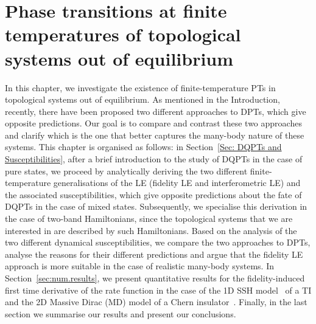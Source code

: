 %
%
%
%
%
%
%
\chapter{Phase transitions at finite temperatures of topological systems out of equilibrium}

 



In this chapter, we investigate the existence of finite-temperature PTs in topological systems out of equilibrium. As mentioned in the Introduction, recently, there have been proposed two different approaches to DPTs, which give opposite predictions. Our goal is to compare and contrast these two approaches and clarify which is the one that better captures the many-body nature of these systems.
This chapter is organised as follows: in Section~\ref{Sec: DQPTs and Susceptibilities}, after a brief introduction to the study of DQPTs in the case of pure states, we proceed by analytically deriving the two different finite-temperature generalisations of the LE (fidelity LE and interferometric LE) and the associated susceptibilities, which give opposite predictions about the fate of DQPTs in the case of mixed states. Subsequently, we specialise this derivation in the case of two-band Hamiltonians, since the topological systems that we are interested in are described by such Hamiltonians. Based on the analysis of the two different dynamical susceptibilities, we compare the two approaches to DPTs, analyse the reasons for their different predictions and argue that the fidelity LE approach is more suitable in the case of realistic many-body systems.  
In Section~\ref{sec:num.results}, we present quantitative results for the fidelity-induced first time derivative of the rate function in the case of the 1D SSH model~\cite{su:sch:hee:79} of a TI and the 2D Massive Dirac (MD) model of a Chern insulator~\cite{qi:hug:zha:08}. Finally, in the last section we summarise our results and present our conclusions.\\  
\vfill

